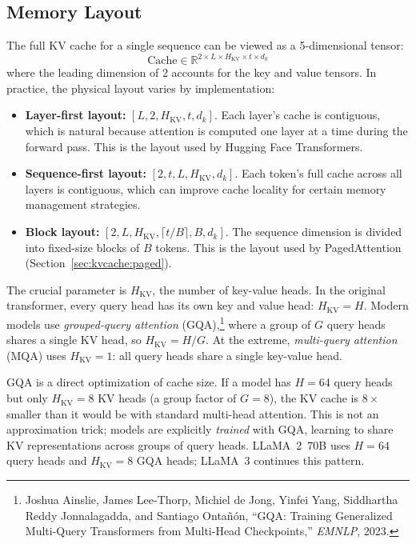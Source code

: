 \subsection{Memory Layout}

The full KV cache for a single sequence can be viewed as a 5-dimensional tensor:
\[
\text{Cache} \in \mathbb{R}^{2 \times L \times H_{\text{KV}} \times t \times d_k}
\]
where the leading dimension of 2 accounts for the key and value tensors. In practice, the physical layout varies by implementation:

\begin{itemize}
  \item \textbf{Layer-first layout:} $[L, 2, H_{\text{KV}}, t, d_k]$. Each layer's cache is contiguous, which is natural because attention is computed one layer at a time during the forward pass. This is the layout used by Hugging Face Transformers.
  \item \textbf{Sequence-first layout:} $[2, t, L, H_{\text{KV}}, d_k]$. Each token's full cache across all layers is contiguous, which can improve cache locality for certain memory management strategies.
  \item \textbf{Block layout:} $[2, L, H_{\text{KV}}, \lceil t / B \rceil, B, d_k]$. The sequence dimension is divided into fixed-size blocks of $B$ tokens. This is the layout used by PagedAttention (Section~\ref{sec:kvcache:paged}).
\end{itemize}

%
The crucial parameter is $H_{\text{KV}}$, the number of key-value heads. In the original transformer, every query head has its own key and value head: $H_{\text{KV}} = H$. Modern models use \emph{grouped-query attention} (GQA),\footnote{Joshua Ainslie, James Lee-Thorp, Michiel de Jong, Yinfei Yang, Siddhartha Reddy Jonnalagadda, and Santiago Onta\~{n}\'{o}n, ``GQA: Training Generalized Multi-Query Transformers from Multi-Head Checkpoints,'' \emph{EMNLP}, 2023.} where a group of $G$ query heads shares a single KV head, so $H_{\text{KV}} = H / G$. At the extreme, \emph{multi-query attention} (MQA) uses $H_{\text{KV}} = 1$: all query heads share a single key-value head.

GQA is a direct optimization of cache size. If a model has $H = 64$ query heads but only $H_{\text{KV}} = 8$ KV heads (a group factor of $G = 8$), the KV cache is $8\times$ smaller than it would be with standard multi-head attention. This is not an approximation trick; models are explicitly \emph{trained} with GQA, learning to share KV representations across groups of query heads. LLaMA~2~70B uses $H = 64$ query heads and $H_{\text{KV}} = 8$ GQA heads; LLaMA~3 continues this pattern.

